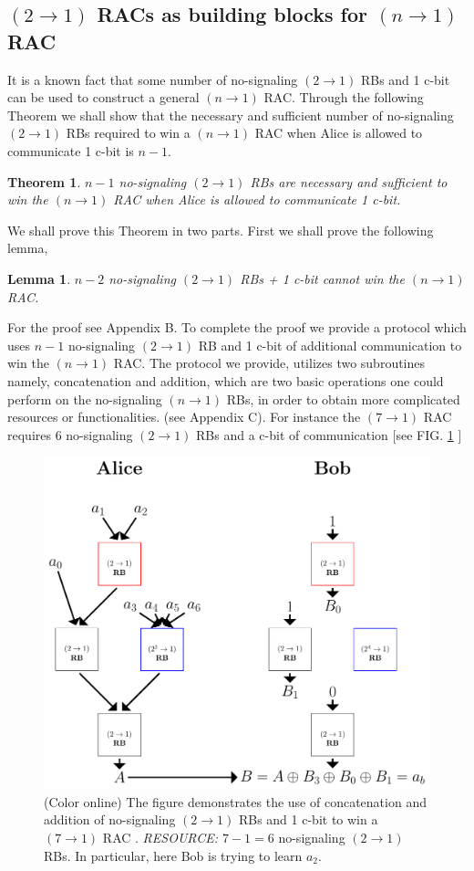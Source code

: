 \documentclass[%
 reprint,
 amsmath,amssymb,
 aps,
]{revtex4-1}
\newtheorem{mydef1}{Theorem}
\newtheorem{mydef2}{Lemma}
\begin{document}
\subsection*{$(2\rightarrow 1)$ RACs as building blocks for $(n\rightarrow1)$ RAC}
\noindent It is a known fact that some number of no-signaling $(2\rightarrow 1)$ RBs and 1 c-bit can be used to construct a general  $(n\rightarrow 1)$ RAC. Through the following Theorem we shall show that the necessary and sufficient number of no-signaling $(2\rightarrow 1)$ RBs required to win a  $(n\rightarrow 1)$ RAC when Alice is allowed to communicate 1 c-bit is $n-1$.
\begin{mydef1} \label{thm3}
$n-1$ no-signaling $(2\rightarrow 1)$ RBs  are necessary and sufficient to win the $(n\rightarrow 1)$ RAC when Alice is allowed to communicate 1 c-bit.
\end{mydef1} 
We shall prove this Theorem in two parts. First we shall prove the following lemma,
\begin{mydef2} \label{lem:countRAC}
$n-2$ no-signaling $(2\rightarrow 1)$ RBs + 1 c-bit cannot win the  $(n\rightarrow 1)$ RAC.
\end{mydef2}
For the proof see Appendix B. To complete the proof we provide a protocol which uses $n-1$ no-signaling $(2\rightarrow 1)$ RB and 1 c-bit of additional communication to win the $(n\rightarrow 1)$ RAC. The protocol we provide, utilizes two subroutines namely, concatenation and addition, which are two basic operations one could perform on the no-signaling $(n\rightarrow1)$ RBs, in order to obtain more complicated resources or functionalities. (see Appendix C). For instance the $(7\rightarrow1)$ RAC requires 6 no-signaling $(2\rightarrow 1)$
RBs and a c-bit of communication [see FIG. \ref{7to1} ]
\begin{figure} 
\includegraphics[scale=0.5]{7.pdf}
\caption{ \label{7to1} (Color online) The figure demonstrates the use of concatenation and addition of no-signaling $(2\rightarrow 1)$
RBs and 1 c-bit
to win a $(7\rightarrow 1)$ RAC  . \textit{RESOURCE: $7-1=6$ } no-signaling $(2\rightarrow 1)$
RBs. In particular, here Bob is trying to learn $a_2$.}
\end{figure}
\end{document}
